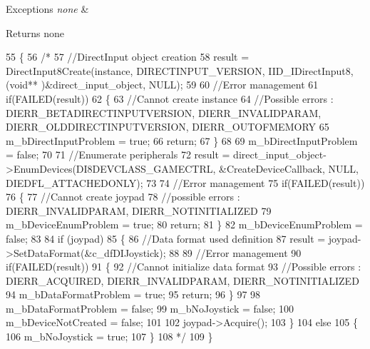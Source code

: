 \begin{DoxyExceptions}{Exceptions}
{\em none} & \\
\hline
\end{DoxyExceptions}
\begin{DoxyReturn}{Returns}
none 
\end{DoxyReturn}

\begin{DoxyCode}
55 \{
56     \textcolor{comment}{/*}
57 \textcolor{comment}{    //DirectInput object creation}
58 \textcolor{comment}{    result = DirectInput8Create(instance, DIRECTINPUT\_VERSION, IID\_IDirectInput8, (void**
      )&direct\_input\_object, NULL); }
59 \textcolor{comment}{}
60 \textcolor{comment}{    //Error management}
61 \textcolor{comment}{    if(FAILED(result))}
62 \textcolor{comment}{    \{}
63 \textcolor{comment}{        //Cannot create instance}
64 \textcolor{comment}{        //Possible errors : DIERR\_BETADIRECTINPUTVERSION, DIERR\_INVALIDPARAM, DIERR\_OLDDIRECTINPUTVERSION,
       DIERR\_OUTOFMEMORY}
65 \textcolor{comment}{        m\_bDirectInputProblem = true;}
66 \textcolor{comment}{        return;}
67 \textcolor{comment}{    \}}
68 \textcolor{comment}{}
69 \textcolor{comment}{    m\_bDirectInputProblem = false;}
70 \textcolor{comment}{}
71 \textcolor{comment}{    //Enumerate peripherals}
72 \textcolor{comment}{    result  = direct\_input\_object->EnumDevices(DI8DEVCLASS\_GAMECTRL, &CreateDeviceCallback, NULL,
       DIEDFL\_ATTACHEDONLY);}
73 \textcolor{comment}{}
74 \textcolor{comment}{    //Error management}
75 \textcolor{comment}{    if(FAILED(result))}
76 \textcolor{comment}{    \{}
77 \textcolor{comment}{        //Cannot create joypad}
78 \textcolor{comment}{        //possible errors : DIERR\_INVALIDPARAM, DIERR\_NOTINITIALIZED}
79 \textcolor{comment}{        m\_bDeviceEnumProblem = true;}
80 \textcolor{comment}{        return;}
81 \textcolor{comment}{    \}}
82 \textcolor{comment}{    m\_bDeviceEnumProblem = false;}
83 \textcolor{comment}{}
84 \textcolor{comment}{    if (joypad)}
85 \textcolor{comment}{    \{}
86 \textcolor{comment}{        //Data format used definition}
87 \textcolor{comment}{        result = joypad->SetDataFormat(&c\_dfDIJoystick); }
88 \textcolor{comment}{}
89 \textcolor{comment}{        //Error management}
90 \textcolor{comment}{        if(FAILED(result))}
91 \textcolor{comment}{        \{ }
92 \textcolor{comment}{            //Cannot initialize data format}
93 \textcolor{comment}{            //Possible errors : DIERR\_ACQUIRED, DIERR\_INVALIDPARAM, DIERR\_NOTINITIALIZED}
94 \textcolor{comment}{            m\_bDataFormatProblem = true;}
95 \textcolor{comment}{            return;}
96 \textcolor{comment}{        \}}
97 \textcolor{comment}{}
98 \textcolor{comment}{        m\_bDataFormatProblem = false;}
99 \textcolor{comment}{        m\_bNoJoystick = false;}
100 \textcolor{comment}{        m\_bDeviceNotCreated = false;}
101 \textcolor{comment}{}
102 \textcolor{comment}{        joypad->Acquire();}
103 \textcolor{comment}{    \}}
104 \textcolor{comment}{    else}
105 \textcolor{comment}{    \{}
106 \textcolor{comment}{        m\_bNoJoystick = true;}
107 \textcolor{comment}{    \}}
108 \textcolor{comment}{        */}
109 \}
\end{DoxyCode}
